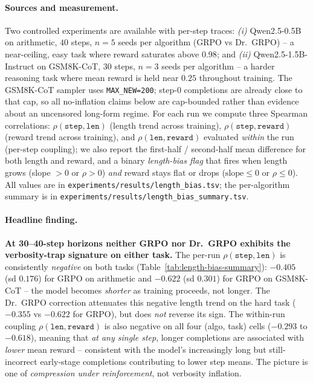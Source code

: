 \paragraph{Sources and measurement.}
Two controlled experiments are available with per-step traces:
\emph{(i)} Qwen2.5-0.5B on arithmetic, $40$ steps, $n{=}5$ seeds per
algorithm (GRPO vs Dr.~GRPO) -- a near-ceiling, easy task where
reward saturates above $0.98$; and
\emph{(ii)} Qwen2.5-1.5B-Instruct on GSM8K-CoT, $30$ steps, $n{=}3$
seeds per algorithm -- a harder reasoning task where mean reward
is held near $0.25$ throughout training. The GSM8K-CoT sampler uses
\texttt{MAX\_NEW=200}; step-0 completions are already close to that cap, so
all no-inflation claims below are cap-bounded rather than evidence about an
uncensored long-form regime.
For each run we compute three Spearman correlations:
$\rho(\texttt{step}, \texttt{len})$ (length trend across training),
$\rho(\texttt{step}, \texttt{reward})$ (reward trend across
training), and $\rho(\texttt{len}, \texttt{reward})$ evaluated
\emph{within} the run (per-step coupling); we also report the
first-half / second-half mean difference for both length and
reward, and a binary \emph{length-bias flag} that fires when
length grows (slope $>0$ or $\rho>0$) \emph{and} reward stays flat
or drops ($\text{slope}\le 0$ or $\rho\le 0$). All values are in
\texttt{experiments/results/length\_bias.tsv}; the per-algorithm
summary is in
\texttt{experiments/results/length\_bias\_summary.tsv}.

\paragraph{Headline finding.}
\textbf{At 30--40-step horizons neither GRPO nor Dr.~GRPO exhibits
the verbosity-trap signature on either task.} The per-run
$\rho(\texttt{step}, \texttt{len})$ is consistently \emph{negative}
on both tasks (Table~\ref{tab:length-bias-summary}): $-0.405$ (sd
$0.176$) for GRPO on arithmetic and $-0.622$ (sd $0.301$) for GRPO
on GSM8K-CoT -- the model becomes \emph{shorter} as training
proceeds, not longer. The Dr.~GRPO correction attenuates this
negative length trend on the hard task ($-0.355$ vs $-0.622$ for
GRPO), but does \emph{not} reverse its sign. The within-run
coupling $\rho(\texttt{len}, \texttt{reward})$ is also negative on
all four (algo, task) cells ($-0.293$ to $-0.618$), meaning that
\emph{at any single step}, longer completions are associated with
\emph{lower} mean reward -- consistent with the model's
increasingly long but still-incorrect early-stage completions
contributing to lower step means. The picture is one of
\emph{compression under reinforcement}, not verbosity inflation.

